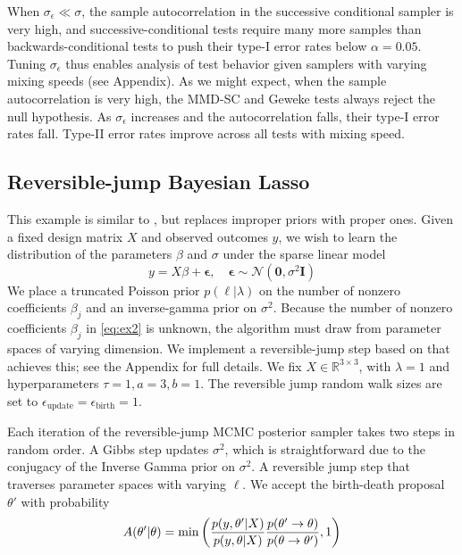 \documentclass{article}
\begin{document}
When $\sigma_{\epsilon} \ll \sigma$, the sample autocorrelation in the successive conditional sampler is very high, and successive-conditional tests require many more samples than backwards-conditional tests to push their type-I error rates below $\alpha=0.05$. Tuning $\sigma_{\epsilon}$ thus enables analysis of test behavior given samplers with varying mixing speeds (see Appendix). As we might expect, when the sample autocorrelation is very high, the MMD-SC and Geweke tests always reject the null hypothesis. As $\sigma_{\epsilon}$ increases and the autocorrelation falls, their type-I error rates fall. Type-II error rates improve across all tests with mixing speed.

\subsection{Reversible-jump Bayesian Lasso}
\label{section:ex2}
This example is similar to \cite{chen_bayesian_2011}, but replaces improper priors with proper ones. Given a fixed design matrix $X$ and observed outcomes $y$, we wish to learn the distribution of the parameters $\beta$ and $\sigma$ under the sparse linear model
\begin{equation}
    y = X\beta + \mathbf{\epsilon}, \quad \mathbf{\epsilon} \sim \mathcal{N}(\mathbf{0}, \sigma^{2} \mathbf{I})
    \label{eq:ex2}
\end{equation}
We place a truncated Poisson prior $p(\ell|\lambda)$ on the number of nonzero coefficients $\beta_{j}$ and an inverse-gamma prior on $\sigma^{2}$. Because the number of nonzero coefficients $\beta_{j}$ in \eqref{eq:ex2} is unknown, the algorithm must draw from parameter spaces of varying dimension. We implement a reversible-jump step \citep{green_reversible_1995} based on \cite{chen_bayesian_2011} that achieves this; see the Appendix for full details. We fix $X \in \mathbb{R}^{3 \times 3}$, with $\lambda=1$ and hyperparameters $\tau=1, a=3, b=1$. The reversible jump random walk sizes are set to $\epsilon_\text{update}= \epsilon_\text{birth}=1$.

Each iteration of the reversible-jump MCMC posterior sampler takes two steps in random order. A Gibbs step updates $\sigma^{2}$, which is straightforward due to the conjugacy of the Inverse Gamma prior on $\sigma^{2}$. A reversible jump step that traverses parameter spaces with varying $\ell$. We accept the birth-death proposal $\theta'$ with probability 
\begin{equation}
    A(\theta'|\theta) = \min{\left(\frac{p(y, \theta' | X )}{p(y, \theta | X )} \frac{p(\theta' \rightarrow \theta)}{p(\theta \rightarrow \theta')}, 1\right)} \\
\end{equation}
\end{document}
